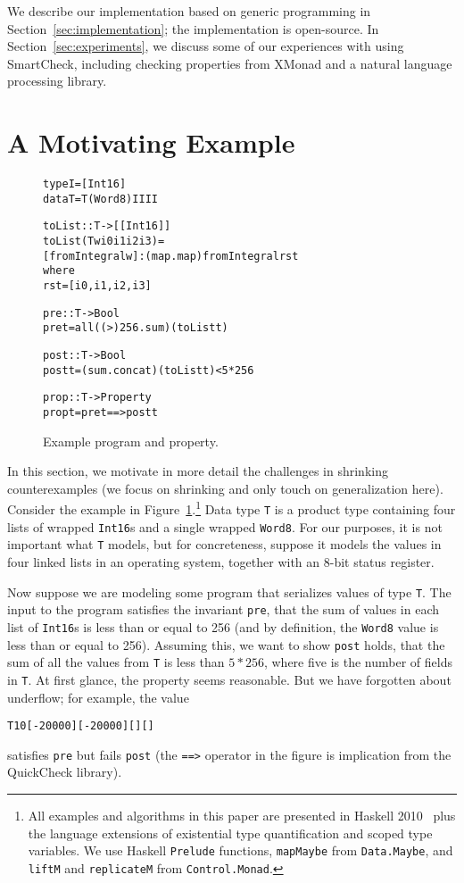 \documentclass{sigplanconf}
\newenvironment{code}{\begin{alltt}\footnotesize}{\end{alltt}}
\newcommand{\ttp}[1]{\texttt{#1}}
\begin{document}
We describe our implementation based on generic programming in
Section~\ref{sec:implementation}; the implementation is open-source.  In
Section~\ref{sec:experiments}, we discuss some of our experiences with using
SmartCheck, including checking properties from XMonad and a natural language
processing library.

\section{A Motivating Example}\label{sec:example}


\begin{figure}[ht]
\begin{code}
type I   = [Int16]
data T   = T (Word8) I I I I

toList :: T -> [[Int16]]
toList (T w i0 i1 i2 i3) =
  [fromIntegral w] : (map . map) fromIntegral rst
  where
  rst = [i0, i1, i2, i3]

pre :: T -> Bool
pre t = all ((>) 256 . sum) (toList t)

post :: T -> Bool
post t = (sum . concat) (toList t) < 5 * 256

prop :: T -> Property
prop t = pre t ==> post t
\end{code}
  \caption{Example program and property.}
  \label{fig:initial}
\end{figure}

In this section, we motivate in more detail the challenges in shrinking
counterexamples (we focus on shrinking and only touch on generalization here).
Consider the example in Figure~\ref{fig:initial}.\footnote{All examples and
  algorithms in this paper are presented in Haskell 2010~\cite{haskell2010} plus
  the language extensions of existential type quantification and scoped type
  variables.  We use Haskell \ttp{Prelude} functions, \ttp{mapMaybe} from
  \ttp{Data.Maybe}, and \ttp{liftM} and \ttp{replicateM} from
  \ttp{Control.Monad}.}  Data type \ttp{T} is a product type containing four
lists of wrapped \ttp{Int16}s and a single wrapped \ttp{Word8}.  For our
purposes, it is not important what \ttp{T} models, but for concreteness, suppose
it models the values in four linked lists in an operating system, together with
an 8-bit status register.

Now suppose we are modeling some program that serializes values of type \ttp{T}.
The input to the program satisfies the invariant \ttp{pre}, that the sum of
values in each list of \ttp{Int16}s is less than or equal to 256 (and by
definition, the \ttp{Word8} value is less than or equal to 256).  Assuming this,
we want to show \ttp{post} holds, that the sum of all the values from \ttp{T} is
less than $5 * 256$, where five is the number of fields in \ttp{T}.  At first
glance, the property seems reasonable.  But we have forgotten about underflow;
for example, the value
%
\begin{code}
T 10 [-20000] [-20000] [] []
\end{code}
%
\noindent
satisfies \ttp{pre} but fails \ttp{post} (the \ttp{==>} operator in the figure
is implication from the QuickCheck library).
\end{document}

